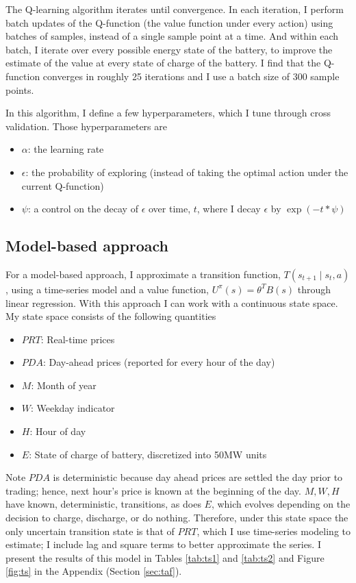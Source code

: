 \documentclass[conference]{IEEEtran}
\begin{document}
The Q-learning algorithm iterates until convergence. In each iteration, I perform batch updates of the Q-function (the value function under every action) using batches of samples, instead of a single sample point at a time. And within each batch, I iterate over every possible energy state of the battery, to improve the estimate of the value at every state of charge of the battery. I find that the Q-function converges in roughly 25 iterations and I use a batch size of 300 sample points.

In this algorithm, I define a few hyperparameters, which I tune through cross validation. Those hyperparameters are
\begin{itemize}
    \item $\alpha$: the learning rate
    \item $\epsilon$: the probability of exploring (instead of taking the optimal action under the current Q-function)
    \item $\psi$: a control on the decay of $\epsilon$ over time, $t$, where I decay $\epsilon$ by $\exp(-t * \psi)$
\end{itemize}

\subsection{Model-based approach}
For a model-based approach, I approximate a transition function, $T(s_{t+1} \mid s_t, a)$, using a time-series model and a value function, $U^\pi(s) = \theta^TB(s)$ through linear regression. With this approach I can work with a continuous state space. My state space consists of the following quantities
\begin{itemize}
    \item $PRT$: Real-time prices
    \item $PDA$: Day-ahead prices (reported for every hour of the day)
    \item $M$: Month of year
    \item $W$: Weekday indicator
    \item $H$: Hour of day
    \item $E$: State of charge of battery, discretized into 50MW units
\end{itemize}

 Note $PDA$ is deterministic because day ahead prices are settled the day prior to trading; hence, next hour's price is known at the beginning of the day. $M,W,H$ have known, deterministic, transitions, as does $E$, which evolves depending on the decision to charge, discharge, or do nothing. Therefore, under this state space the only uncertain transition state is that of $PRT$, which I use time-series modeling to estimate; I include lag and square terms to better approximate the series. I present the results of this model in Tables \ref{tab:ts1} and \ref{tab:ts2} and Figure \ref{fig:ts} in the Appendix (Section \ref{sec:taf}).
\end{document}
